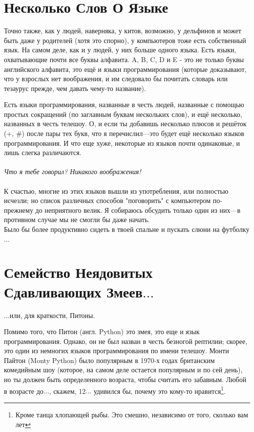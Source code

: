 \section{Несколько Слов О Языке}

Точно также, как у людей, наверняка, у китов, возможно, у дельфинов и может быть даже у родителей (хотя это спорно), у компьютеров тоже есть собственный язык. На самом деле, как и у людей, у них больше одного языка. Есть языки, охватывающие почти все буквы алфавита. A, B, C, D и E - это не только буквы английского алфавита, это ещё и языки программирования (которые доказывают, что у взрослых нет воображения, и им следовало бы почитать словарь или тезаурус прежде, чем давать чему-то название).

Есть языки программирования, названные в честь людей, названные с помощью простых сокращений (по заглавным буквам нескольких слов), и ещё несколько, названных в честь телешоу. О, и если ты добавишь несколько плюсов и решёток (+, \#) после пары тех букв, что я перечислил---это будет ещё несколько языков программирования. И что еще хуже, некоторые из языков почти одинаковые, и лишь слегка различаются.
\\
\\
\emph{Что я тебе говорил? Никакого воображения! }
\\
\\
К счастью, многие из этих языков вышли из употребления, или полностью исчезли; но список различных способов "поговорить" с компьютером по-прежнему до неприятного велик. Я собираюсь обсудить только один из них---в противном случае мы не смогли бы даже начать.
\\
Было бы более продуктивно сидеть в твоей спальне и пускать слюни на футболку$\ldots$

\section{Семейство Неядовитых\\Сдавливающих Змеев$\ldots$}

$\ldots$или, для краткости, Питоны.

Помимо того, что Питон (англ. Python) это змея, это еще и язык программирования. Однако, он не был назван в честь безногой рептилии; скорее, это один из немногих языков программирования по имени телешоу. Монти Пайтон (Monty Python) было популярным в 1970-х годах британским комедийным шоу (которое, на самом деле остается популярным и по сей день), но ты должен быть определенного возраста, чтобы считать его забавным. Любой в возрасте до$\ldots$, скажем, 12$\ldots$ удивился бы, почему это кому-то нравится\footnote{Кроме танца хлопающей рыбы. Это смешно, независимо от того, сколько вам лет}.

